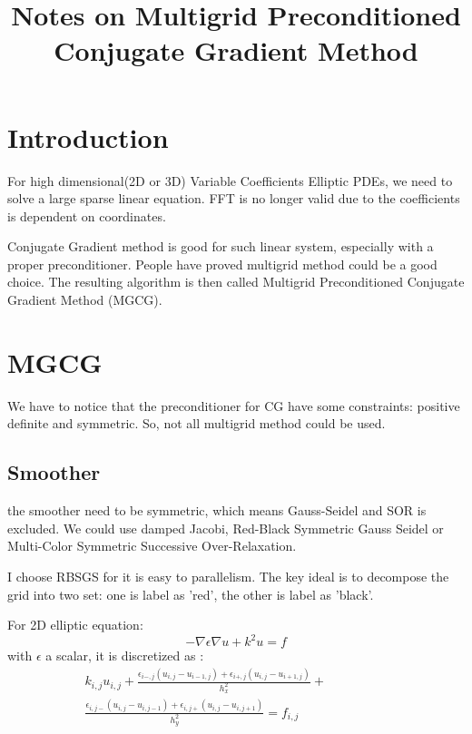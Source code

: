 \documentclass{article}
\begin{document}
\title{Notes on Multigrid Preconditioned Conjugate Gradient Method}
\maketitle

\section{Introduction}
For high dimensional(2D or 3D) Variable Coefficients Elliptic PDEs, we need to solve a large sparse linear equation. FFT is no longer valid due to the coefficients is dependent on coordinates.

Conjugate Gradient method is good for such linear system, especially with a proper preconditioner. People have proved multigrid method could be a good choice. The resulting algorithm is then called Multigrid Preconditioned Conjugate Gradient Method (MGCG).

\section{MGCG}
We have to notice that the preconditioner for CG have some constraints: positive definite and symmetric. So, not all multigrid method could be used. 

\subsection{Smoother}

the smoother need to be symmetric, which means Gauss-Seidel and SOR is excluded. We could use damped Jacobi, Red-Black Symmetric Gauss Seidel or Multi-Color Symmetric Successive Over-Relaxation.

I choose RBSGS for it is easy to parallelism. The key ideal is to decompose the grid into two set: one is label as 'red', the other is label as 'black'. 

For 2D elliptic equation:
\begin{equation}
-\nabla \epsilon \nabla u + k^2 u= f
\end{equation}
with $\epsilon$ a scalar, it is discretized as :
\begin{eqnarray}
 k_{i,j} u_{i,j}+ \frac{\epsilon_{i-,j}(u_{i,j} -u_{i-1,j})+\epsilon_{i+,j}(u_{i,j}-u_{i+1,j})}{h_x^2} + \hspace{2cm}\nonumber \\
\frac{\epsilon_{i,j-}(u_{i,j} -u_{i,j-1})+\epsilon_{i,j+}(u_{i,j}-u_{i,j+1})}{h_y^2}  = f_{i,j}
\end{eqnarray}
\end{document}
